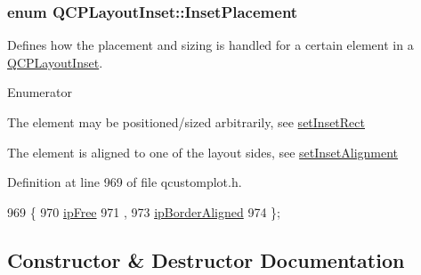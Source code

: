 \subsubsection[{Inset\+Placement}]{\setlength{\rightskip}{0pt plus 5cm}enum {\bf Q\+C\+P\+Layout\+Inset\+::\+Inset\+Placement}}\label{class_q_c_p_layout_inset_a8b9e17d9a2768293d2a7d72f5e298192}
Defines how the placement and sizing is handled for a certain element in a \hyperlink{class_q_c_p_layout_inset}{Q\+C\+P\+Layout\+Inset}. \begin{Desc}
\item[Enumerator]\par
\begin{description}
\item[{\em 
\hypertarget{class_q_c_p_layout_inset_a8b9e17d9a2768293d2a7d72f5e298192aa4802986ea2cea457f932b115acba59e}{}ip\+Free\label{class_q_c_p_layout_inset_a8b9e17d9a2768293d2a7d72f5e298192aa4802986ea2cea457f932b115acba59e}
}]The element may be positioned/sized arbitrarily, see \hyperlink{class_q_c_p_layout_inset_aa487c8378a6f9533567a2e6430099dc3}{set\+Inset\+Rect} \item[{\em 
\hypertarget{class_q_c_p_layout_inset_a8b9e17d9a2768293d2a7d72f5e298192aa81e7df4a785ddee2229a8f47c46e817}{}ip\+Border\+Aligned\label{class_q_c_p_layout_inset_a8b9e17d9a2768293d2a7d72f5e298192aa81e7df4a785ddee2229a8f47c46e817}
}]The element is aligned to one of the layout sides, see \hyperlink{class_q_c_p_layout_inset_a62882a4f9ad58bb0f53da12fde022abe}{set\+Inset\+Alignment} \end{description}
\end{Desc}


Definition at line 969 of file qcustomplot.\+h.


\begin{DoxyCode}
969                       \{
970     \hyperlink{class_q_c_p_layout_inset_a8b9e17d9a2768293d2a7d72f5e298192aa4802986ea2cea457f932b115acba59e}{ipFree} 
971     ,
973     \hyperlink{class_q_c_p_layout_inset_a8b9e17d9a2768293d2a7d72f5e298192aa81e7df4a785ddee2229a8f47c46e817}{ipBorderAligned} 
974   \};
\end{DoxyCode}


\subsection{Constructor \& Destructor Documentation}
\hypertarget{class_q_c_p_layout_inset_a3ad984f3221735374cc5dee14356a7dd}{}
